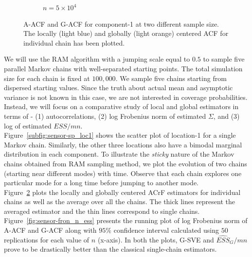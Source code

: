 \documentclass[11pt]{article}
\theoremstyle{remark}
\begin{document}
\begin{figure}[h]
\begin{subfigure}[h]{.4\textwidth}
       \caption{$n = 5 \times 10^4$}
       \label{subfig:sensor-acf_n5e4}
     \end{subfigure}
     \caption{A-ACF and G-ACF for component-1 at two different sample size. The locally (light blue) and globally (light orange) centered ACF for individual chain has been plotted.}
     \label{fig:sensor-acf}
 \end{figure}


We will use the RAM algorithm with a jumping scale equal to $0.5$ to sample five parallel Markov chains with well-separated starting points. The total simulation size for each chain is fixed at $100,000$. We sample five chains starting from dispersed starting values. Since the truth about actual mean and asymptotic variance is not known in this case, we are not interested in coverage probabilities. Instead, we will focus on a comparative study of local and global estimators in terms of - (1) autocorrelations, (2) log Frobenius norm of estimated $\Sigma$, and (3) log of estimated $ESS/mn$.\\

Figure~\ref{subfig:sensor-sp_loc1} shows the scatter plot of location-1 for a single Markov chain. Similarly, the other three locations also have a bimodal marginal distribution in each component. To illustrate the \textit{sticky} nature of the Markov chains obtained from RAM sampling method, we plot the evolution of two chains (starting near different modes) with time. Observe that each chain explores one particular mode for a long time before jumping to another mode. \\

Figure~\ref{fig:sensor-acf} plots the locally and globally centered ACrF estimators for individual chains as well as the average over all the chains. The thick lines represent the averaged estimator and the thin lines correspond to single chains. Figure~\ref{fig:sensor-fron_n_ess} presents the running plot of log Frobenius norm of A-ACF and G-ACF along with $95\%$ confidence interval calculated using $50$ replications for each value of $n$ (x-axis). In both the plots, G-SVE and $\hat{ESS}_G/mn$ prove to be drastically better than the classical single-chain estimators. 
\end{document}
